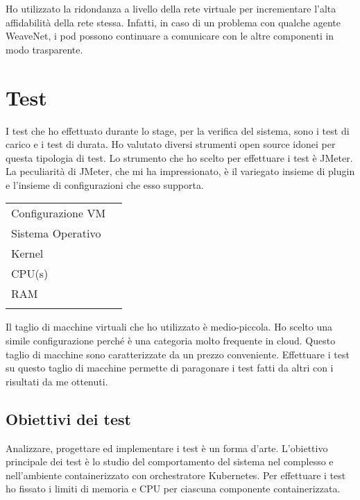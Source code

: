 Ho utilizzato la ridondanza a livello della rete virtuale per incrementare 
l'alta affidabilità della rete stessa. Infatti, in caso di un problema con 
qualche agente WeaveNet, i pod possono continuare a comunicare con le 
altre componenti in modo trasparente. 


\section{Test}
I test che ho effettuato durante lo stage, per la 
verifica del sistema, sono i test di carico e i test di durata. 
Ho valutato diversi strumenti open source idonei per questa 
tipologia di test. Lo strumento che ho scelto per effettuare i test è JMeter.
La peculiarità di JMeter, che mi ha impressionato, è il variegato 
insieme di plugin e l'insieme di configurazioni che esso supporta.

\begin{center}
	\begin{tabular}
		{l||p{5cm}}	
		\arrayrulecolor{white}
		\rowcolor{glaucous}	
		Configurazione VM & 
		\makebox[5cm][c]{Valore}\\
		\rowcolor{lightcornflowerblue}
		Sistema Operativo &
		\makebox[5cm][c]{CentOS7}\\
		\rowcolor{moonstoneblue}
		Kernel &
		\makebox[5cm][c]{3.10.x86-64}\\
		\rowcolor{lightcornflowerblue}
		CPU(s) &
		\makebox[5cm][c]{4} \\
		\rowcolor{moonstoneblue}
		RAM &
		\makebox[5cm][c]{4GB}\\ 
		\rowcolor{lightcornflowerblue}
	\end{tabular}		  
\end{center}

Il taglio di macchine virtuali che ho utilizzato è medio-piccola.
Ho scelto una simile configurazione perché è una categoria molto frequente in cloud.
Questo taglio di macchine sono caratterizzate da un prezzo conveniente. Effettuare 
i test su questo taglio di macchine permette di paragonare i test fatti da altri
con i risultati da me ottenuti.

\subsection{Obiettivi dei test}
Analizzare, progettare ed implementare i test è un forma d'arte.
L'obiettivo principale dei test è lo studio del comportamento
del sistema nel complesso e nell'ambiente containerizzato 
con orchestratore Kubernetes. Per effettuare i test ho fissato 
i limiti di memoria e CPU per ciascuna componente containerizzata. 

